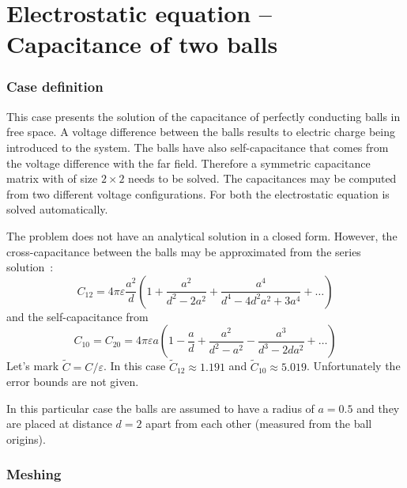 \chapter{Electrostatic equation -- Capacitance of two balls}




\subsection*{Case definition}

This case presents the solution of the capacitance of perfectly conducting balls in free space. 
A voltage difference between the balls results to electric charge being introduced to the system. The balls have 
also self-capacitance that comes from the voltage difference with the far field. Therefore a symmetric capacitance matrix
with of size $2\times2$ needs to be solved.
The capacitances may be computed from two different voltage configurations.
For both the electrostatic equation is solved automatically. 

The problem does not have an analytical solution in a closed form. 
However, the cross-capacitance between the balls may be approximated from the series solution~\cite[Ch.~A.3]{wasshuber97}:
\begin{equation}
C_{12} = 4 \pi \varepsilon \frac{a^2}{d}\left ( 1 + \frac{a^2}{d^2-2a^2} + \frac{a^4}{d^4-4d^2a^2 + 3a^4}+ \ldots \right )
\end{equation}
and the self-capacitance from 
\begin{equation}
C_{10} = C_{20} = 4 \pi \varepsilon a \left ( 1 - \frac{a}{d} + \frac{a^2}{d^2-a^2} - \frac{a^3}{d^3-2da^2}+ \ldots \right )
\end{equation}
Let's mark $\tilde{C} = C / \varepsilon$. In this case $\tilde{C}_{12} \approx 1.191$ and $\tilde{C}_{10} \approx 5.019$.
Unfortunately the error bounds are not given.

In this particular case 
the balls are assumed to have a radius of $a=0.5$ and they are placed at distance $d=2$ apart from 
each other (measured from the ball origins). 


\subsection*{Meshing}

